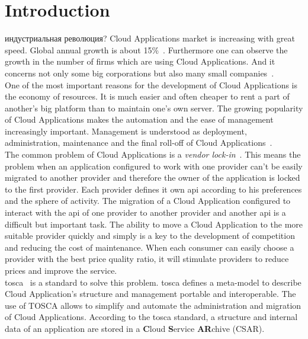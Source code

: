 
\chapter{Introduction}
индустриальная революция?
\fi
Cloud Applications market is increasing with great speed. 
Global annual growth is about 15\%~\cite*{statista_global}.
Furthermore one can observe the growth in the number of firms which are using Cloud Applications. 
And it concerns not only some big corporations but also many small companies~\cite*{destatis_2014, destatis_2016}. \\ 
One of the most important reasons for the development of Cloud Applications is the economy of resources.
It is much easier and often cheaper to rent a part of another's big platform than to maintain one's own server.
The growing popularity of Cloud Applications makes the automation and the ease of management increasingly important.
Management is understood as deployment, administration, maintenance and the final roll-off of Cloud Applications~\cite*{autocloud}. \\   
The common problem of Cloud Applications is a \emph{vendor lock-in}~\cite*{lockin}. 
This means the problem when an application configured to work with one provider can't be easily migrated to another provider and therefore the owner of the application is locked to the first provider.
Each provider defines it own \gls{api} according to his preferences and the sphere of activity.
The migration of a Cloud Application configured to interact with the \gls{api} of one provider to another provider and another \gls{api} is a difficult but important task. 
The ability to move a Cloud Application to the more suitable provider quickly and simply is a key to the development of competition and reducing the cost of maintenance. 
When each consumer can easily choose a provider with the best price quality ratio, it will stimulate providers to reduce prices and improve the service.\\
\gls{tosca}~\cite*{TOSCA-v1.0} is a standard to solve this problem. 
\gls{tosca} defines a meta-model to describe Cloud Application's structure and management portable and interoperable. 
The use of TOSCA allows to simplify and automate the administration and migration of Cloud Applications. 
According to the \gls{tosca} standard, a structure and internal data of an application are stored in a \textbf{C}loud \textbf{S}ervice \textbf{AR}chive (CSAR).
